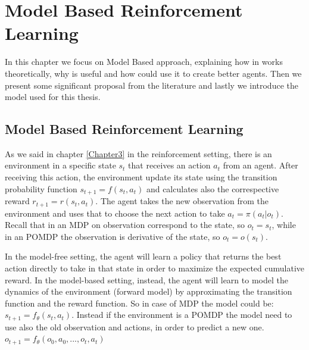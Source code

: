 
\chapter{Model Based Reinforcement Learning} %

\label{Chapter5} 
In this chapter we focus on Model Based approach, explaining how in works theoretically, why is useful and how could use it to create better agents. Then we present some  significant proposal from the literature and lastly we introduce the model used for this thesis. 


\newcommand{\method}{PlaNet}
\newcommand{\fullmethod}{Deep Planning Network }
\newcommand{\Foruno}{\\  $\mathbf{\textbf{for } }$  }
\newcommand{\Fordue}{\\ \tab{} $\mathbf{\textbf{for } }$  }
\newcommand{\Fortre}{\\ \tab{} \tab{} $\mathbf{\textbf{for } }$  }

\section{Model Based Reinforcement Learning}

As we said in chapter \ref{Chapter3} in the reinforcement setting, there is an environment in a specific state $s_t$ that receives an action $a_t$ from an agent. 
After receiving this action, the environment update its state using the transition probability function $s_{t+1} = f\left(s_{t}, a_{t}\right)$
and calculates also the correspective reward $r_{t+1}=r\left(s_{t}, a_{t}\right).$
The agent takes the new observation from the environment and uses that to choose the next action to take $a_t=\pi(a_t|o_t)$.
Recall that in an MDP on observation correspond to the state, so $o_t = s_t$, while in an POMDP the observation is derivative of the state, so $o_t=o(s_t)$.

In the model-free setting, the agent will learn a policy that returns the best action directly to take in that state in order to maximize the expected cumulative reward.
In the model-based setting, instead, the agent will learn to model the dynamics of the environment (forward model) by approximating the transition function and the reward function.
So in case of MDP the model could be:
$ s_{t+1} = f_\theta (s_t,a_t).$
Instead if the environment is a POMDP the model need to use also the old observation and actions, in order to predict a new one.
$ o_{t+1} = f_\theta(o_0,a_0,...,o_t, a_t)$

